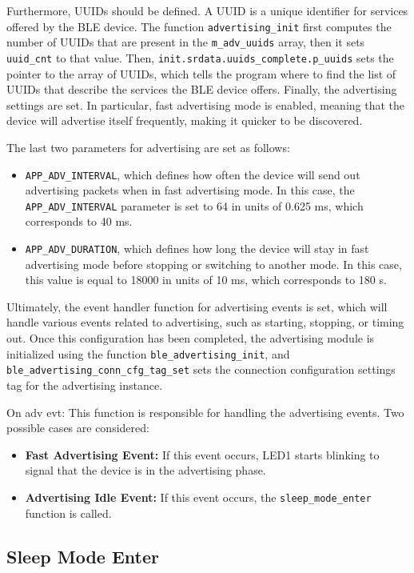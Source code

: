 \documentclass{Configuration_Files/PoliMi3i_thesis}
\begin{document}
Furthermore, UUIDs should be defined. A UUID is a unique identifier for services offered by the BLE device. The function \texttt{advertising\_init} first computes the number of UUIDs that are present in the \texttt{m\_adv\_uuids} array, then it sets \texttt{uuid\_cnt} to that value. Then, \texttt{init.srdata.uuids\_complete.p\_uuids} sets the pointer to the array of UUIDs, which tells the program where to find the list of UUIDs that describe the services the BLE device offers. Finally, the advertising settings are set. In particular, fast advertising mode is enabled, meaning that the device will advertise itself frequently, making it quicker to be discovered. 

The last two parameters for advertising are set as follows:
\begin{itemize}
    \item \texttt{APP\_ADV\_INTERVAL}, which defines how often the device will send out advertising packets when in fast advertising mode. In this case, the \texttt{APP\_ADV\_INTERVAL} parameter is set to 64 in units of 0.625 ms, which corresponds to 40 ms.
    \item \texttt{APP\_ADV\_DURATION}, which defines how long the device will stay in fast advertising mode before stopping or switching to another mode. In this case, this value is equal to 18000 in units of 10 ms, which corresponds to 180 s.
\end{itemize}

Ultimately, the event handler function for advertising events is set, which will handle various events related to advertising, such as starting, stopping, or timing out. Once this configuration has been completed, the advertising module is initialized using the function \texttt{ble\_advertising\_init}, and \texttt{ble\_advertising\_conn\_cfg\_tag\_set} sets the connection configuration settings tag for the advertising instance.


On adv evt: This function is responsible for handling the advertising events. Two possible cases are considered:
\begin{itemize}
    \item \textbf{Fast Advertising Event:} If this event occurs, LED1 starts blinking to signal that the device is in the advertising phase.
    \item \textbf{Advertising Idle Event:} If this event occurs, the \texttt{sleep\_mode\_enter} function is called.
\end{itemize}

\subsection*{Sleep Mode Enter}
\end{document}
